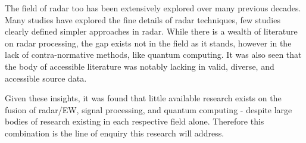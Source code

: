 The field of radar too has been extensively explored over many previous decades.
Many studies have explored the fine details of radar techniques, few studies clearly defined simpler approaches in radar.
While there is a wealth of literature on radar processing, the gap exists not in the field as it stands, however in the lack of contra-normative methods, like quantum computing.
It was also seen that the body of accessible literature was notably lacking in valid, diverse, and accessible source data.

Given these insights, it was found that little available research exists on the fusion of radar/\ac{EW}, signal processing, and quantum computing - despite large bodies of research existing in each respective field alone.
Therefore this combination is the line of enquiry this research will address.


